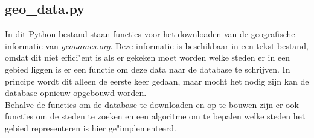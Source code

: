 \documentclass[twoside,openright]{uva-bachelor-thesis}
\begin{document}
		\subsection{geo\_data.py}
		In dit Python bestand staan functies voor het downloaden van de geografische informatie van \textit{geonames.org}. Deze informatie is beschikbaar in een tekst bestand, omdat dit niet effici"ent is als er gekeken moet worden welke steden er in een gebied liggen is er een functie om deze data naar de database te schrijven. In principe wordt dit alleen de eerste keer gedaan, maar mocht het nodig zijn kan de database opnieuw opgebouwd worden.\\[0.5cm]
		Behalve de functies om de database te downloaden en op te bouwen zijn er ook functies om de steden te zoeken en een algoritme om te bepalen welke steden het gebied representeren is hier ge"implementeerd.
\end{document}
